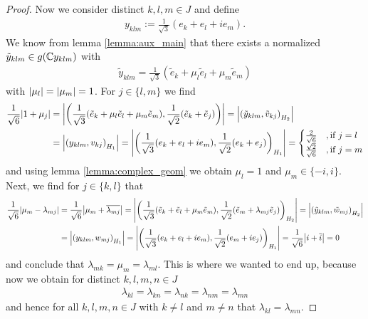 \begin{proof}
	 Now we consider distinct $k,l,m \in J$ and define
	 \begin{align*}
	 	y_{klm} := \frac{1}{\sqrt{3}}(e_k + e_l + ie_m).
	 \end{align*}
	 We know from lemma \ref{lemma:aux_main} that there exists a normalized $\tilde{y}_{klm} \in g(\mathbb{C} y_{klm})$ with 
	 \begin{align*}
	 	\tilde{y}_{klm} = \frac{1}{\sqrt{3}}(\tilde{e}_k + \mu_l \tilde{e}_l + \mu_m \tilde{e}_m)
	 \end{align*}
	 with ${\left | \mu_l \right |} = {\left | \mu_m \right |} = 1$. For $j \in \{l,m\}$ we find
	 \begin{align*}
	 	\frac{1}{\sqrt{6}} {\left | 1 + \mu_j \right |} &= {\left | {\left ( \frac{1}{\sqrt{3}}(\tilde{e}_k + \mu_l \tilde{e}_l + \mu_m \tilde{e}_m), \frac{1}{\sqrt{2}}(\tilde{e}_k + \tilde{e}_j) \right )} \right |} = {\left | {\left ( \tilde{y}_{klm}, \tilde{v}_{kj} \right )}_{H_2} \right |} \\
	 	&= {\left | {\left ( y_{klm}, v_{kj} \right )}_{H_1} \right |} = {\left | {\left ( \frac{1}{\sqrt{3}}(e_k + e_l + ie_m), \frac{1}{\sqrt{2}}(e_k + e_j) \right )}_{H_1} \right |} = 
	 	\begin{cases}
	 		\frac{2}{\sqrt{6}} &, \text{if } j = l \\
	 		\frac{\sqrt{2}}{\sqrt{6}} &, \text{if } j = m
	 	\end{cases}
	\end{align*}
	and using lemma \ref{lemma:complex_geom} we obtain $\mu_l = 1$ and $\mu_m \in \{-i, i\}$. Next, we find for $j \in \{k,l\}$ that
	\begin{align*}
		\frac{1}{\sqrt{6}} {\left | \mu_m - \lambda_{mj} \right |} &= \frac{1}{\sqrt{6}} {\left | \mu_m + \overline{\lambda_{mj}} \right |} = {\left | {\left ( \frac{1}{\sqrt{3}}(\tilde{e}_k + \tilde{e}_l + \mu_m \tilde{e}_m), \frac{1}{\sqrt{2}}(\tilde{e}_m + \lambda_{mj} \tilde{e}_j) \right )}_{H_2} \right |} = {\left | {\left ( \tilde{y}_{klm}, \tilde{w}_{mj} \right )}_{H_2} \right |} \\
		&= {\left | {\left ( y_{klm}, w_{mj} \right )}_{H_1} \right |} = {\left | {\left ( \frac{1}{\sqrt{3}}(e_k + e_l + ie_m), \frac{1}{\sqrt{2}}(e_m + ie_j) \right )}_{H_1} \right |} = \frac{1}{\sqrt{6}}{\left | i + \overline{i} \right |} = 0
	\end{align*}
	and conclude that $\lambda_{mk} = \mu_m = \lambda_{ml}$. This is where we wanted to end up, because now we obtain for distinct $k,l,m,n \in J$
	\begin{align*}
		\lambda_{kl} = \lambda_{kn} = \lambda_{nk} = \lambda_{nm} = \lambda_{mn}
	\end{align*}
	and hence for all $k,l,m,n \in J$ with $k \neq l$ and $m \neq n$ that $\lambda_{kl} = \lambda_{mn}$. 
	

\end{proof}
